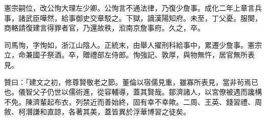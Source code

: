 \begin{pinyinscope}
憲宗嗣位，改公恂大理左少卿。公恂言不通法律，乃復少詹事。成化二年上章言兵事，諸武臣嘩然，給事御史交章駁之。下獄，謫漢陽知府。未至，丁父憂。服闋，商輅請復建言得罪者官，乃還故秩，涖南京詹事府。久之，卒。

司馬恂，字恂如，浙江山陰人。正統末，由舉人擢刑科給事中，累遷少詹事。憲宗立，命兼國子祭酒。卒，贈禮部左侍郎。恂強記、敦厚，與物無忤，居官無所表見。

贊曰：「建文之初，修尊賢敬老之節。董倫以宿儒見重，雖寡所表見，當非茍焉已也。儀智父子仍世以儒術進，從容輔導，蓋其賢哉。鄒濟諸人，以宮僚被遇而讒構不免。陳濟輩起布衣，列禁近而善始終，固有幸不幸歟。二周、王英、錢習禮、周敘、柯潛謙和直諒，各著其美，蓋皆異於浮華博習之徒矣。


\end{pinyinscope}